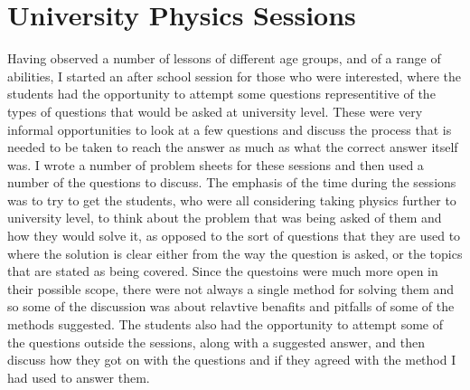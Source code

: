\section{University Physics Sessions} %
\label{sec:university_physics_sessions}
	Having observed a number of lessons of different age groups, and of a range of abilities, I started an after school session for those who were interested, where the students had the opportunity to attempt some questions representitive of the types of questions that would be asked at university level. These were very informal opportunities to look at a few questions and discuss the process that is needed to be taken to reach the answer as much as what the correct answer itself was. I wrote a number of problem sheets for these sessions and then used a number of the questions to discuss. The emphasis of the time during the sessions was to try to get the students, who were all considering taking physics further to university level, to think about the problem that was being asked of them and how they would solve it, as opposed to the sort of questions that they are used to where the solution is clear either from the way the question is asked, or the topics that are stated as being covered. Since the questoins were much more open in their possible scope, there were not always a single method for solving them and so some of the discussion was about relavtive benafits and pitfalls of some of the methods suggested. The students also had the opportunity to attempt some of the questions outside the sessions, along with a suggested answer, and then discuss how they got on with the questions and if they agreed with the method I had used to answer them.



